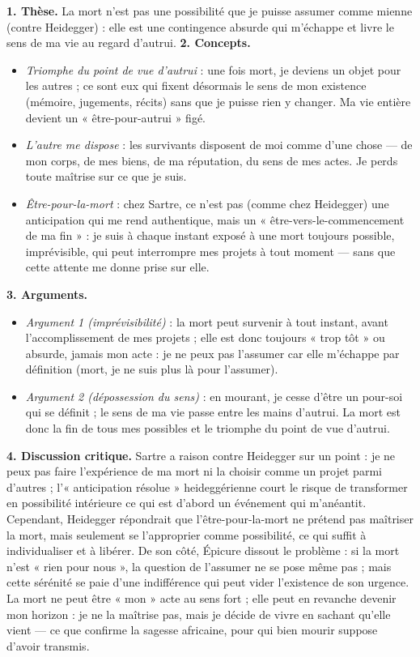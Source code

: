 \documentclass[11pt]{article}
\begin{document}
\begin{corrige}
\textbf{1. Thèse.} La mort n'est pas une possibilité que je puisse assumer comme mienne (contre Heidegger) : elle est une contingence absurde qui m'échappe et livre le sens de ma vie au regard d'autrui.
\textbf{2. Concepts.}
\begin{itemize}
\item \emph{Triomphe du point de vue d'autrui} : une fois mort, je deviens un objet pour les autres ; ce sont eux qui fixent désormais le sens de mon existence (mémoire, jugements, récits) sans que je puisse rien y changer. Ma vie entière devient un « être-pour-autrui » figé.
\item \emph{L'autre me dispose} : les survivants disposent de moi comme d'une chose — de mon corps, de mes biens, de ma réputation, du sens de mes actes. Je perds toute maîtrise sur ce que je suis.
\item \emph{Être-pour-la-mort} : chez Sartre, ce n'est pas (comme chez Heidegger) une anticipation qui me rend authentique, mais un « être-vers-le-commencement de ma fin » : je suis à chaque instant exposé à une mort toujours possible, imprévisible, qui peut interrompre mes projets à tout moment — sans que cette attente me donne prise sur elle.
\end{itemize}
\textbf{3. Arguments.}
\begin{itemize}
\item \emph{Argument 1 (imprévisibilité)} : la mort peut survenir à tout instant, avant l'accomplissement de mes projets ; elle est donc toujours « trop tôt » ou absurde, jamais mon acte : je ne peux pas l'assumer car elle m'échappe par définition (mort, je ne suis plus là pour l'assumer).
\item \emph{Argument 2 (dépossession du sens)} : en mourant, je cesse d'être un pour-soi qui se définit ; le sens de ma vie passe entre les mains d'autrui. La mort est donc la fin de tous mes possibles et le triomphe du point de vue d'autrui.
\end{itemize}
\textbf{4. Discussion critique.} Sartre a raison contre Heidegger sur un point : je ne peux pas faire l'expérience de ma mort ni la choisir comme un projet parmi d'autres ; l'« anticipation résolue » heideggérienne court le risque de transformer en possibilité intérieure ce qui est d'abord un événement qui m'anéantit. Cependant, Heidegger répondrait que l'être-pour-la-mort ne prétend pas maîtriser la mort, mais seulement se l'approprier comme possibilité, ce qui suffit à individualiser et à libérer. De son côté, Épicure dissout le problème : si la mort n'est « rien pour nous », la question de l'assumer ne se pose même pas ; mais cette sérénité se paie d'une indifférence qui peut vider l'existence de son urgence. La mort ne peut être « mon » acte au sens fort ; elle peut en revanche devenir mon horizon : je ne la maîtrise pas, mais je décide de vivre en sachant qu'elle vient — ce que confirme la sagesse africaine, pour qui bien mourir suppose d'avoir transmis.


\end{corrige}
\end{document}
